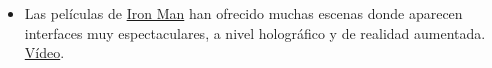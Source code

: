 \begin{itemize}
    \item Las películas de \href{https://www.youtube.com/watch?v=P5k-4-OEuTk}{Iron Man} han ofrecido muchas escenas donde aparecen interfaces muy espectaculares, a nivel holográfico y de realidad aumentada. \href{https://www.youtube.com/watch?v=P5k-4-OEuTk}{Vídeo}.

\end{itemize}